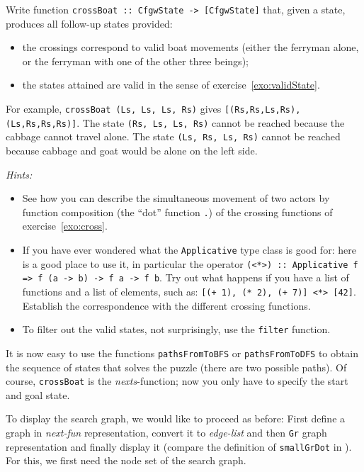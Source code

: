 \documentclass[english]{article}
\begin{document}
\begin{exo}\label{exo:crossBoat}
  Write function \texttt{crossBoat :: CfgwState -> [CfgwState]} that, given a
  state, produces all follow-up states provided:
  \begin{itemize}
  \item the crossings correspond to valid boat movements (either the ferryman
    alone, or the ferryman with one of the other three beings);
  \item the states attained are valid in the sense of exercise~\ref{exo:validState}.
  \end{itemize}
  For example, \texttt{crossBoat (Ls, Ls, Ls, Rs)} gives
  \texttt{[(Rs,Rs,Ls,Rs),(Ls,Rs,Rs,Rs)]}. The state \texttt{(Rs, Ls, Ls, Rs)}
  cannot be reached because the cabbage cannot travel alone. The state
  \texttt{(Ls, Rs, Ls, Rs)} cannot be reached because cabbage and goat would
  be alone on the left side.

  \emph{Hints:}
  \begin{itemize}
  \item See how you can describe the simultaneous movement of two actors by
    function composition (the ``dot'' function \texttt{.}) of the crossing
    functions of exercise~\ref{exo:cross}.
  \item If you have ever wondered what the \texttt{Applicative} type class is
    good for: here is a good place to use it, in particular the operator
    \texttt{(<*>) :: Applicative f => f (a -> b) -> f a -> f b}. Try out what
    happens if you have a
    list of functions and a list of elements, such as: \texttt{[(+ 1), (* 2),
      (+ 7)] <*> [42]}. Establish the correspondence with the different crossing functions.
  \item To filter out the valid states, not surprisingly, use the \texttt{filter} function.
  \end{itemize}
\end{exo}

\begin{exo}\label{exo:cfgwSearch}
  It is now easy to use the functions \texttt{pathsFromToBFS} or
  \texttt{pathsFromToDFS} to obtain the sequence of states that solves the
  puzzle (there are two possible paths). Of course, \texttt{crossBoat} is the
  \emph{nexts}-function; now you only have to specify the start and goal state.
\end{exo}

To display the search graph, we would like to proceed as before: First define
a graph in \emph{next-fun} representation, convert it to \emph{edge-list} and
then \texttt{Gr} graph representation and finally display it (compare the
definition of \texttt{smallGrDot} in ). For this, we
first need the node set of the search graph.
\end{document}
